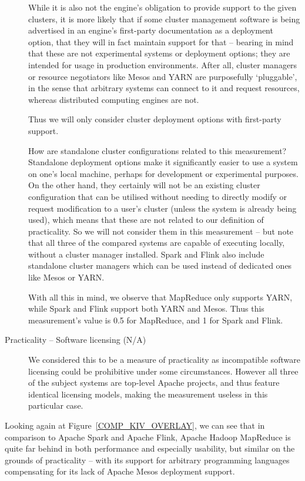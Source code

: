 \begin{description}
      While it is also not the engine's obligation to provide support to the given clusters, it is more likely that if some cluster management software is being advertised in an engine's first-party documentation as a deployment option, that they will in fact maintain support for that -- bearing in mind that these are not experimental systems or deployment options; they are intended for usage in production environments. After all, cluster managers or resource negotiators like Mesos and YARN are purposefully `pluggable', in the sense that arbitrary systems can connect to it and request resources, whereas distributed computing engines are not.

      Thus we will only consider cluster deployment options with first-party support.

      How are standalone cluster configurations related to this measurement? Standalone deployment options make it significantly easier to use a system on one's local machine, perhaps for development or experimental purposes. On the other hand, they certainly will not be an existing cluster configuration that can be utilised without needing to directly modify or request modification to a user's cluster (unless the system is already being used), which means that these are not related to our definition of practicality. So we will not consider them in this measurement -- but note that all three of the compared systems are capable of executing locally, without a cluster manager installed. Spark and Flink also include standalone cluster managers which can be used instead of dedicated ones like Mesos or YARN.

      With all this in mind, we observe that MapReduce only supports YARN, while Spark and Flink support both YARN and Mesos. Thus this measurement's value is 0.5 for MapReduce, and 1 for Spark and Flink.

    \item[Practicality -- Software licensing (N/A)]
      We considered this to be a measure of practicality as incompatible software licensing could be prohibitive under some circumstances. However all three of the subject systems are top-level Apache projects, and thus feature identical licensing models, making the measurement useless in this particular case.
  \end{description}

  Looking again at Figure~\ref{COMP_KIV_OVERLAY}, we can see that in comparison to Apache Spark and Apache Flink, Apache Hadoop MapReduce is quite far behind in both performance and especially usability, but similar on the grounds of practicality -- with its support for arbitrary programming languages compensating for its lack of Apache Mesos deployment support.
  
